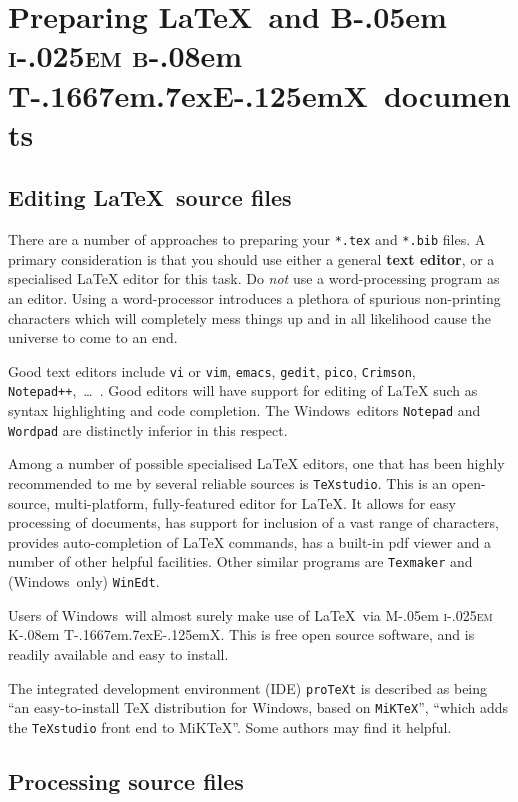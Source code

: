 \documentclass[times, doublespace]{anzsauth}
\newcommand\BibTeX{{\rmfamily B\kern-.05em \textsc{i\kern-.025em b}\kern-.08em
T\kern-.1667em\lower.7ex\hbox{E}\kern-.125emX}}
\newcommand\MiKTeX{{\rmfamily M\kern-.05em \textsc{i\kern-.025em K}\kern-.08em
T\kern-.1667em\lower.7ex\hbox{E}\kern-.125emX}}
\begin{document}
\section{Preparing \LaTeX\ and \BibTeX\ documents}
\label{sec:prepDocs}

\subsection{Editing \LaTeX\ source files}
\label{sec:editors}

There are a number of approaches to preparing your \texttt{*.tex}
and \texttt{*.bib} files. A primary consideration is that you should
use either a general \textbf{text editor}, or a specialised \LaTeX{}
editor for this task.  Do \emph{not} use a word-processing program as
an editor. Using a word-processor introduces a plethora of spurious
non-printing characters which will completely mess things up and
in all likelihood cause the universe to come to an end.

Good text editors include \texttt{vi} or \texttt{vim},
\texttt{emacs}, \texttt{gedit}, \texttt{pico}, \texttt{Crimson},
\texttt{Notepad++},~\ldots\ .  Good editors will have support
for editing of \LaTeX{} such as syntax highlighting and code
completion. The Windows\texttrademark\ editors \texttt{Notepad}
and \texttt{Wordpad} are distinctly inferior in this respect.

Among a number of possible specialised \LaTeX{} editors, one that
has been highly recommended to me by several reliable sources
is \texttt{TeXstudio}. This is an open-source, multi-platform,
fully-featured editor for \LaTeX{}. It allows for easy processing of
documents, has support for inclusion of a vast range of characters,
provides auto-completion of \LaTeX{} commands, has a built-in pdf
viewer and a number of other helpful facilities. Other similar
programs are \texttt{Texmaker} and (Windows\texttrademark\ only)
\texttt{WinEdt}.

Users of Windows\texttrademark\ will almost surely make use of
\LaTeX\ via \MiKTeX.  This is free open source software, and is
readily available and easy to install.

The integrated development environment (IDE) \texttt{proTeXt} is
described as being ``an easy-to-install \TeX{} distribution for
Windows\texttrademark, based on \texttt{MiKTeX}'', ``which adds
the \texttt{TeXstudio} front end to MiKTeX''.  Some authors may
find it helpful.

\subsection{Processing source files}
\label{sec:procBib}
\end{document}
